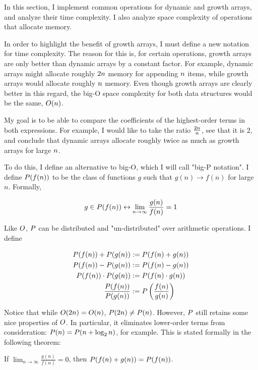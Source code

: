 In this section, I implement common operations for dynamic and growth arrays, and analyze their time complexity. I also analyze space complexity of operations that allocate memory.

In order to highlight the benefit of growth arrays, I must define a new notation for time complexity. The reason for this is, for certain operations, growth arrays are only better than dynamic arrays by a constant factor. For example, dynamic arrays might allocate roughly $2n$ memory for appending $n$ items, while growth arrays would allocate roughly $n$ memory. Even though growth arrays are clearly better in this regard, the big-O space complexity for both data structures would be the same, $O(n)$.

My goal is to be able to compare the coefficients of the highest-order terms in both expressions. For example, I would like to take the ratio $\frac{2n}{n}$, see that it is $2$, and conclude that dynamic arrays allocate roughly twice as much as growth arrays for large $n$.

To do this, I define an alternative to big-O, which I will call "big-P notation". I define $P(f(n))$ to be the class of functions $g$ such that $g(n) \to f(n)$ for large $n$. Formally,

$$
g \in P(f(n)) \leftrightarrow \lim_{n \to \infty} \frac{g(n)}{f(n)} = 1
$$

Like $O$, $P$ can be distributed and "un-distributed" over arithmetic operations. I define

\begin{align*}
P(f(n)) + P(g(n)) &:= P(f(n) + g(n))\\
P(f(n)) - P(g(n)) &:= P(f(n) - g(n))\\
P(f(n)) \cdot P(g(n)) &:= P(f(n) \cdot g(n))\\
\frac {P(f(n))} {P(g(n))} &:= P\left(\frac{f(n)} {g(n)}\right)
\end{align*}

Notice that while $O(2n) = O(n)$, $P(2n) \neq P(n)$. However, $P$ still retains some nice properties of $O$. In particular, it eliminates lower-order terms from consideration: $P(n) = P(n + \log_2 n)$, for example. This is stated formally in the following theorem:

\begin{theorem}
\label{ScrubsLowerOrderTerms}
	If $\lim_{n \to \infty} \frac{g(n)}{f(n)} = 0$, then $P(f(n) + g(n)) = P(f(n))$.
\end{theorem}

